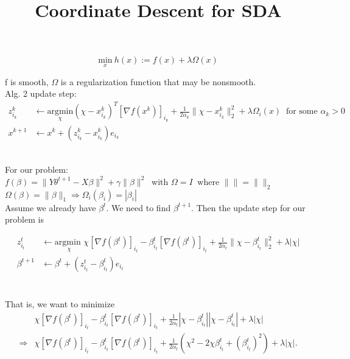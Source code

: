 \documentclass[12pt, reqno]{amsart}
\theoremstyle{definition}
\theoremstyle{remark}
\begin{document}
\title[]{Coordinate Descent for SDA}
\maketitle

\begin{equation*}
\underset{x}{\text{min}}\ h(x) := f(x) + \lambda \Omega (x) 
\end{equation*}

f is smooth,  $\Omega$ is a regularization function that may be nonsmooth.\\

Alg. 2 update step:
\begin{equation*}
\begin{split}
z_{i_k}^k &\leftarrow \underset{\chi}{\text{argmin}} (\chi - x_{i_k}^k)^T[\nabla f(x^k)]_{i_k} + \frac{1}{2 \alpha _k} \| \chi - x_{i_k}^k \|_2 ^2 + \lambda \Omega_i(x) \ \text{ for some } \alpha _k > 0 \\
x^{k+1} &\leftarrow x^k + (z_{i_k}^k - x_{i_k}^k) e_{i_k}
\end{split}
\end{equation*}

\hfill \\

For our problem: \\ 
$f(\beta) = \|Y \theta^{t+1} - X \beta \|^2 + \gamma \|\beta\|^2 \ $ with $\Omega = I \ $ where $ \| \| = \|  \|_2$\\
$\Omega(\beta) = \|\beta\|_1 \Rightarrow \Omega_i(\beta_i) = |\beta_i|$\\

Assume we already have $\beta^t$. We need to find $\beta^{t+1}$. Then the update step for our problem is 

\begin{equation*}
\begin{split}
z_{i_t}^t &\leftarrow \underset{\chi}{\text{argmin }} \chi [\nabla 				f(\beta^t)]_{i_t} - \beta_{i_t}^t [\nabla f(\beta^t)]_{i_t} + \frac{1}		{2 \alpha _t} \| \chi - \beta_{i_t}^t \|_2 ^2 + \lambda |\chi| \\
\beta^{t+1} &\leftarrow \beta^t + (z_{i_t}^t - \beta_{i_t}^t) e_{i_t} \\
\end{split}
\end{equation*}

\hfill \\
That is, we want to minimize 
\begin{equation*}
\begin{split}
& \chi [\nabla f(\beta^t)]_{i_t} - \beta_{i_t}^t [\nabla f(\beta^t)]_{i_t} + \frac{1}{2 \alpha _t} | \chi - \beta_{i_t}^t | | \chi - \beta_{i_t}^t | + \lambda | \chi |\\
\Rightarrow & \chi [\nabla f(\beta^t)]_{i_t} - \beta_{i_t}^t [\nabla f(\beta^t)]_{i_t} + \frac{1}{2 \alpha _t} (\chi ^2 - 2 \chi \beta_{i_t}^t + (\beta_{i_t}^t)^2) + \lambda | \chi |.\\
\end{split}
\end{equation*}
\end{document}
